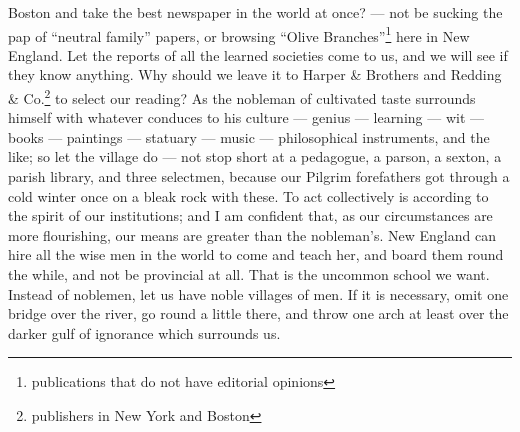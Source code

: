 \documentclass[letterpaper,12pt]{article}
\begin{document}
Boston and take the best newspaper in the world at once? --- not be sucking the
pap of \enquote{neutral family} papers, or browsing \enquote{Olive
    Branches}\footnote{publications that do not have editorial opinions} here in
New England. Let the reports of all the learned societies come to us, and we
will see if they know anything. Why should we leave it to Harper \& Brothers and
Redding \& Co.\footnote{publishers in New York and Boston} to select our
reading? As the nobleman of cultivated taste surrounds himself with whatever
conduces to his culture --- genius --- learning --- wit --- books --- paintings
--- statuary --- music --- philosophical instruments, and the like; so let the
village do --- not stop short at a pedagogue, a parson, a sexton, a parish
library, and three selectmen, because our Pilgrim forefathers got through a cold
winter once on a bleak rock with these. To act collectively is according to the
spirit of our institutions; and I am confident that, as our circumstances are
more flourishing, our means are greater than the nobleman's. New England can
hire all the wise men in the world to come and teach her, and board them round
the while, and not be provincial at all. That is the uncommon school we want.
Instead of noblemen, let us have noble villages of men. If it is necessary, omit
one bridge over the river, go round a little there, and throw one arch at least
over the darker gulf of ignorance which surrounds us.
\end{document}
